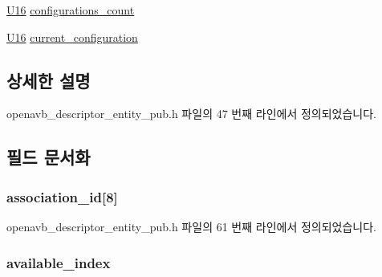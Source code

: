 \begin{DoxyCompactItemize}
\item 
\hyperlink{openavb__types__base__pub_8h_a0a0a322d5fa4a546d293a77ba8b4a71f}{U16} \hyperlink{structopenavb__aem__descriptor__entity__t_a0a613fdbf90b3d95dae7caf1ecae4786}{configurations\+\_\+count}
\item 
\hyperlink{openavb__types__base__pub_8h_a0a0a322d5fa4a546d293a77ba8b4a71f}{U16} \hyperlink{structopenavb__aem__descriptor__entity__t_a589ef08113e1a67ac14c2a976c3c9036}{current\+\_\+configuration}
\end{DoxyCompactItemize}


\subsection{상세한 설명}


openavb\+\_\+descriptor\+\_\+entity\+\_\+pub.\+h 파일의 47 번째 라인에서 정의되었습니다.



\subsection{필드 문서화}
\subsubsection[{\texorpdfstring{association\+\_\+id}{association_id}}]{ association\+\_\+id\mbox{[}8\mbox{]}}\hypertarget{structopenavb__aem__descriptor__entity__t_a920b3895c87e46889863d44538f57702}{}\label{structopenavb__aem__descriptor__entity__t_a920b3895c87e46889863d44538f57702}


openavb\+\_\+descriptor\+\_\+entity\+\_\+pub.\+h 파일의 61 번째 라인에서 정의되었습니다.

\subsubsection[{\texorpdfstring{available\+\_\+index}{available_index}}]{ available\+\_\+index}\hypertarget{structopenavb__aem__descriptor__entity__t_afd1f3dd8f9e3b3a1ab9e658dca9e7f6b}{}\label{structopenavb__aem__descriptor__entity__t_afd1f3dd8f9e3b3a1ab9e658dca9e7f6b}


